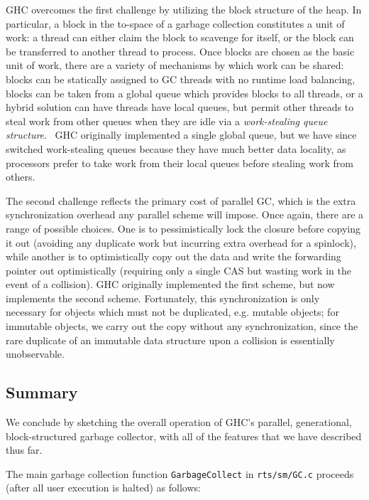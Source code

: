 GHC overcomes the first challenge by utilizing the block structure of
the heap.  In particular, a block in the to-space of a garbage
collection constitutes a unit of work: a thread can either claim the
block to scavenge for itself, or the block can be transferred to another
thread to process.  Once blocks are chosen as the basic unit of
work, there are a variety of mechanisms by which work can be shared:
blocks can be statically assigned to GC threads with no runtime load
balancing, blocks can be taken from a global queue which provides blocks
to all threads, or a hybrid solution can have threads have local queues,
but permit other threads to steal work from other queues when they are
idle via a \emph{work-stealing queue structure}.~\XXX{}  GHC originally
implemented a single global queue, but we have since switched work-stealing queues
because they have much better data locality, as processors prefer to take
work from their local queues before stealing work from others.

The second challenge reflects the primary cost of parallel GC, which is
the extra synchronization overhead any parallel scheme will impose.
Once again, there are a range of possible choices.  One is to
pessimistically lock the closure before copying it out (avoiding any
duplicate work but incurring extra overhead for a spinlock), while
another is to optimistically copy out the data and write the forwarding
pointer out optimistically (requiring only a single CAS but wasting work
in the event of a collision).  GHC originally implemented the first
scheme, but now implements the second scheme.   Fortunately, this synchronization is only necessary for objects
which must not be duplicated, e.g. mutable objects; for immutable
objects, we carry out the copy without any synchronization, since the
rare duplicate of an immutable data structure upon a collision is
essentially unobservable.

\subsection{Summary}

We conclude by sketching the overall operation of GHC's parallel,
generational, block-structured garbage collector, with all of the
features that we have described thus far.

The main garbage collection function
\verb|GarbageCollect| in \verb|rts/sm/GC.c| proceeds (after all user
execution is halted) as follows:


